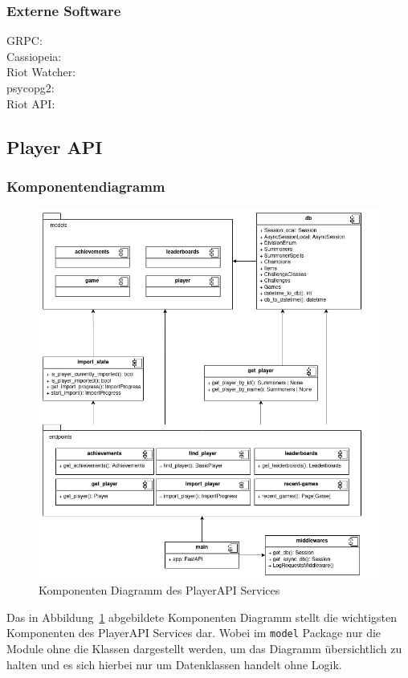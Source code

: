 \subsubsection{Externe Software}
GRPC: \href{https://grpc.io/docs/languages/python/basics/}\\
Cassiopeia: \href{https://github.com/meraki-analytics/cassiopeia}\\
Riot Watcher: \href{https://github.com/pseudonym117/Riot-Watcher}\\
psycopg2: \href{https://pypi.org/project/psycopg2/}\\
Riot API: \href{https://developer.riotgames.com/}\\

\subsection{Player API}

\subsubsection{Komponentendiagramm}\label{subsubsec:player-api-component-diagram}

\begin{figure}
    \centering
    \includegraphics[width=\textwidth]{images/cdc-06-player-api-static.drawio}
    \caption{Komponenten Diagramm des PlayerAPI Services}
    \label{fig:player-api-component-diagram}
\end{figure}
Das in Abbildung~\ref{fig:player-api-component-diagram} abgebildete Komponenten Diagramm stellt die wichtigsten
Komponenten des PlayerAPI Services dar.
Wobei im \lstinline{model} Package nur die Module ohne die Klassen dargestellt werden, um das Diagramm
übersichtlich zu halten und es sich hierbei nur um Datenklassen handelt ohne Logik.


